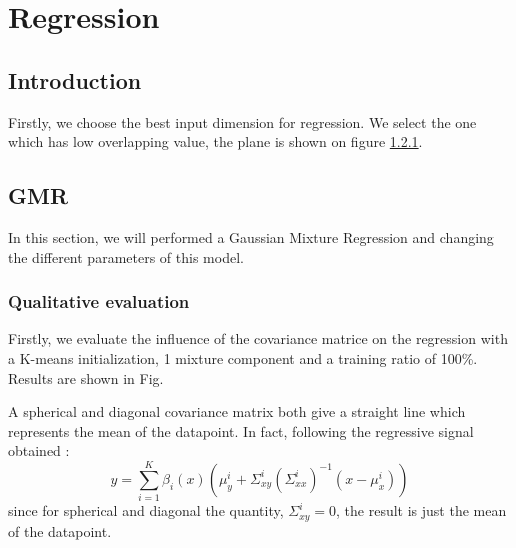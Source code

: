 \section{Regression}
\label{regression}

\subsection{Introduction}
Firstly, we choose the best input dimension for regression. We select the one which has low overlapping value, the plane is shown on figure \ref{}.

\subsection{GMR} 



In this section, we will performed a Gaussian Mixture Regression and changing the different parameters of this model. 
\subsubsection{Qualitative evaluation}
Firstly, we evaluate the influence of the covariance matrice on the regression with a K-means initialization, 1 mixture component and a training ratio of 100\%. Results are shown in Fig.


A spherical and diagonal covariance matrix both give a straight line which represents the mean of the datapoint. In fact, following the regressive signal obtained :
\begin{equation}
y = \sum_{i=1}^K \beta_i(x)(\mu_y^i + \Sigma_{xy}^i (\Sigma_{xx}^i)^{-1}(x - \mu_x^i))  
\label{GMR_output}
\end{equation}
since for spherical and diagonal the quantity, $\Sigma_{xy}^i = 0$, the result is just the mean of the datapoint. 

